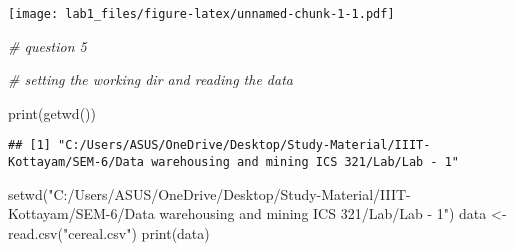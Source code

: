 \documentclass[
]{article}
\newenvironment{Shaded}{\begin{snugshade}}{\end{snugshade}}
\newcommand{\CommentTok}[1]{\textcolor[rgb]{0.56,0.35,0.01}{\textit{#1}}}
\newcommand{\FunctionTok}[1]{\textcolor[rgb]{0.00,0.00,0.00}{#1}}
\newcommand{\NormalTok}[1]{#1}
\newcommand{\OtherTok}[1]{\textcolor[rgb]{0.56,0.35,0.01}{#1}}
\newcommand{\StringTok}[1]{\textcolor[rgb]{0.31,0.60,0.02}{#1}}
\begin{document}
\texttt{[image: lab1\_files/figure-latex/unnamed-chunk-1-1.pdf]}

\begin{Shaded}
\begin{Highlighting}[]
\CommentTok{\# question 5}

\CommentTok{\# setting the working dir and reading the data}

\FunctionTok{print}\NormalTok{(}\FunctionTok{getwd}\NormalTok{())}
\end{Highlighting}
\end{Shaded}

\begin{verbatim}
## [1] "C:/Users/ASUS/OneDrive/Desktop/Study-Material/IIIT-Kottayam/SEM-6/Data warehousing and mining ICS 321/Lab/Lab - 1"
\end{verbatim}

\begin{Shaded}
\begin{Highlighting}[]
\FunctionTok{setwd}\NormalTok{(}\StringTok{"C:/Users/ASUS/OneDrive/Desktop/Study{-}Material/IIIT{-}Kottayam/SEM{-}6/Data warehousing and mining ICS 321/Lab/Lab {-} 1"}\NormalTok{)}
\NormalTok{data }\OtherTok{\textless{}{-}} \FunctionTok{read.csv}\NormalTok{(}\StringTok{"cereal.csv"}\NormalTok{)}
\FunctionTok{print}\NormalTok{(data)}
\end{Highlighting}
\end{Shaded}
\end{document}
